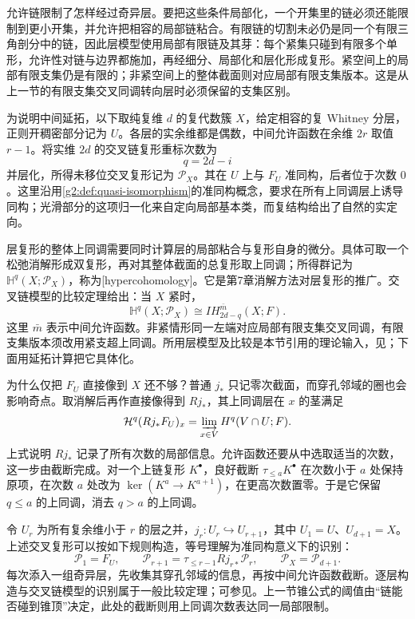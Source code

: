 允许链限制了怎样经过奇异层。要把这些条件局部化，一个开集里的链必须还能限制到更小开集，并允许把相容的局部链粘合。有限链的切割未必仍是同一个有限三角剖分中的链，因此层模型使用局部有限链及其芽：每个紧集只碰到有限多个单形，允许性对链与边界都施加，再经细分、局部化和层化形成复形。紧空间上的局部有限支集仍是有限的；非紧空间上的整体截面则对应局部有限支集版本。这是从上一节的有限支集交叉同调转向层时必须保留的支集区别。

\ProseParagraphBreak

为说明中间延拓，以下取纯复维 \(d\) 的复代数簇 \(X\)，给定相容的复 Whitney 分层，正则开稠密部分记为 \(U\)。各层的实余维都是偶数，中间允许函数在余维 \(2r\) 取值 \(r-1\)。将实维 \(2d\) 的交叉链复形重标次数为
\[
	q=2d-i
\]
并层化，所得未移位交叉复形记为 \(\mathcal P_X\)。其在 \(U\) 上与 \(F_U\) 准同构，后者位于次数 \(0\)。这里沿用\cref{g2:def:quasi-isomorphism}的准同构概念，要求在所有上同调层上诱导同构；光滑部分的这项归一化来自定向局部基本类，而复结构给出了自然的实定向。

\ProseParagraphBreak

层复形的整体上同调需要同时计算层的局部粘合与复形自身的微分。具体可取一个松弛消解形成双复形，再对其整体截面的总复形取上同调；所得群记为 \(\mathbb H^q(X;\mathcal P_X)\)，称为[hypercohomology]。它是第7章消解方法对层复形的推广。交叉链模型的比较定理给出：当 \(X\) 紧时，
\begin{equation}\label{g2:eq:intersection-sheaf-degree}
	\mathbb H^q(X;\mathcal P_X)\cong IH_{2d-q}^{\bar m}(X;F).
\end{equation}
这里 \(\bar m\) 表示中间允许函数。非紧情形同一左端对应局部有限支集交叉同调，有限支集版本须改用紧支超上同调。所用层模型及比较是本节引用的理论输入，见\cite[第5.4节]{Dimca2004Sheaves}；下面用延拓计算把它具体化。

\ProseParagraphBreak

为什么仅把 \(F_U\) 直接像到 \(X\) 还不够？普通 \(j_*\) 只记零次截面，而穿孔邻域的圈也会影响奇点。取消解后再作直接像得到 \(Rj_*\)，其上同调层在 \(x\) 的茎满足
\[
	\mathcal H^q(Rj_*F_U)_x
	=\varinjlim_{x\in V}H^q(V\cap U;F).
\]
上式说明 \(Rj_*\) 记录了所有次数的局部信息。允许函数还要从中选取适当的次数，这一步由截断完成。对一个上链复形 \(K^\bullet\)，良好截断 \(\tau_{\leq a}K^\bullet\) 在次数小于 \(a\) 处保持原项，在次数 \(a\) 处改为 \(\ker(K^a\to K^{a+1})\)，在更高次数置零。于是它保留 \(q\leq a\) 的上同调，消去 \(q>a\) 的上同调。

\ProseParagraphBreak

令 \(U_r\) 为所有复余维小于 \(r\) 的层之并，\(j_r:U_r\hookrightarrow U_{r+1}\)，其中 \(U_1=U\)、\(U_{d+1}=X\)。上述交叉复形可以按如下规则构造，等号理解为准同构意义下的识别：
\begin{equation}\label{g2:eq:intersection-truncation}
	\mathcal P_1=F_U,\qquad
	\mathcal P_{r+1}=\tau_{\leq r-1}Rj_{r*}\mathcal P_r,
	\qquad \mathcal P_X=\mathcal P_{d+1}.
\end{equation}
每次添入一组奇异层，先收集其穿孔邻域的信息，再按中间允许函数截断。逐层构造与交叉链模型的识别属于一般比较定理；可参见\cite[命题5.2.10、定理5.4.1]{Dimca2004Sheaves}。上一节锥公式的阈值由“链能否碰到锥顶”决定，此处的截断则用上同调次数表达同一局部限制。

